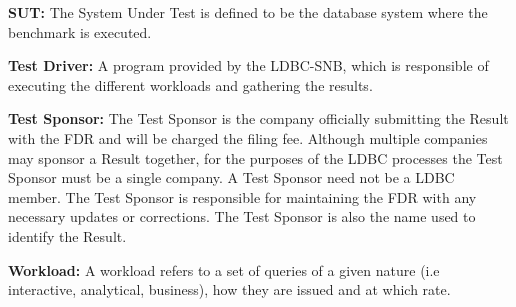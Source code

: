 {\flushleft \textbf{SUT:}} The System Under Test  is defined
to be the database system where the benchmark is executed.


{\flushleft \textbf{Test Driver:}}  A program provided by the LDBC-SNB, which
is responsible of executing the different workloads and gathering the results.

{\flushleft \textbf{Test Sponsor:}} The Test Sponsor is the company officially
submitting the Result with the FDR and will be charged the filing fee. Although
multiple companies may sponsor a Result together, for the purposes of the LDBC
processes the Test Sponsor must be a single company. A Test Sponsor need not be
a LDBC member. The Test Sponsor is responsible for maintaining the FDR with any
necessary updates or corrections. The Test Sponsor is also the name used to
identify the Result.

%



{\flushleft \textbf{Workload:}} A workload refers to a set of queries of a given nature
(i.e interactive, analytical, business), how they are issued and at which rate.

